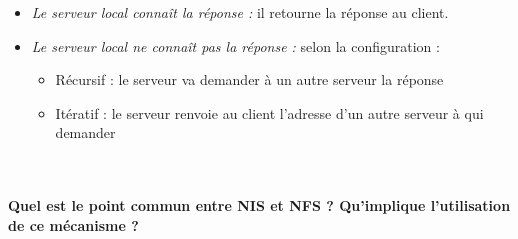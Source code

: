 \documentclass[journal, a4paper]{IEEEtran}
\begin{document}
\begin{itemize}
	\item \textit{Le serveur local connaît la réponse :} il retourne la réponse au client.
	\item \textit{Le serveur local ne connaît pas la réponse :} selon la configuration :
	\begin{itemize}
		\item Récursif : le serveur va demander à un autre serveur la réponse
		\item Itératif : le serveur renvoie au client l'adresse d'un autre serveur à qui demander
	\end{itemize}
\end{itemize}
~\\
~\\
\textbf{Quel est le point commun entre NIS et NFS ? Qu'implique l'utilisation de ce mécanisme ?}\\

\end{document}
